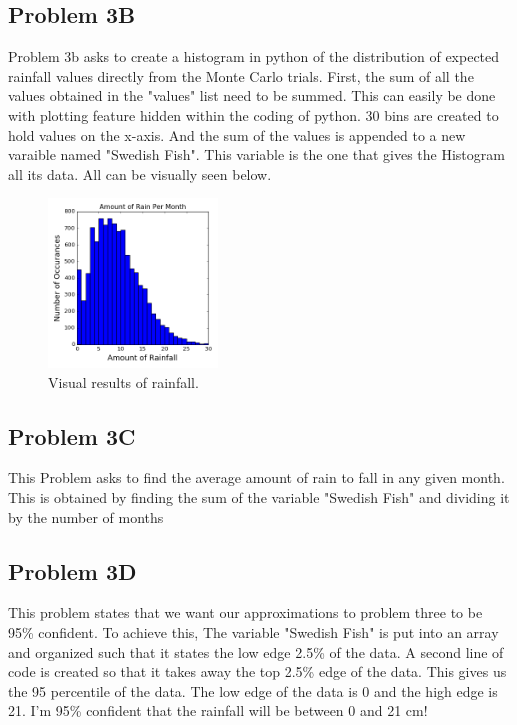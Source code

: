 \documentclass[twocolumn]{revtex4}
\begin{document}
\subsection{Problem 3B}

Problem 3b asks to create a histogram in python of the distribution of expected rainfall values directly from the Monte Carlo trials. First, the sum of all the values obtained in the "values" list need to be summed. This can easily be done with plotting feature hidden within the coding of python. 30 bins are created to hold values on the x-axis. And the sum of the values is appended to a new varaible named "Swedish \textunderscore Fish". This variable is the one that gives the Histogram all its data. All can be visually seen below. 

\begin{figure}[h] 
\centering
\includegraphics[width=0.40\textwidth]{Histogram.png}
\caption{Visual results of rainfall.\label{rain}}
\end{figure}

\subsection{Problem 3C}

This Problem asks to find the average amount of rain to fall in any given month. This is obtained by finding the sum of the variable "Swedish \textunderscore Fish" and dividing it by the number of months 

\subsection{Problem 3D}

This problem states that we want our approximations to problem three to be 95\% confident. To achieve this, The variable "Swedish \textunderscore Fish" is put into an array and organized such that it states the low edge 2.5\% of the data. A second line of code is created so that it takes away the top 2.5\% edge of the data. This gives us the 95 percentile of the data. The low edge of the data is 0 and the high edge is 21. I'm 95\% confident that the rainfall will be between 0 and 21 cm!
\end{document}
